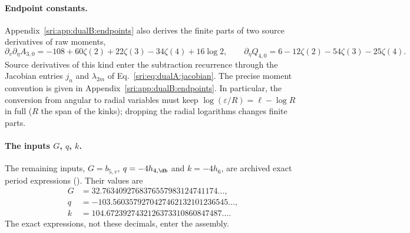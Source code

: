 \paragraph{Endpoint constants.} Appendix~\ref{sri:app:dualB:endpoints} also derives the finite parts of two source
derivatives of raw moments,
\begin{equation}
 \partial_v\partial_\eta A_{3,0}=-108+60\zeta(2)+22\zeta(3)-34\zeta(4)+16\log2,\qquad
 \partial_\eta Q_{4,0}=6-12\zeta(2)-54\zeta(3)-25\zeta(4).
 \label{sri:eq:dualB:endpointconstants}
\end{equation}
Source derivatives of this kind enter the subtraction recurrence through the Jacobian entries $j_n$ and
$\lambda_{2m}$ of Eq.~\eqref{sri:eq:dualA:jacobian}. The precise moment convention is given in
Appendix~\ref{sri:app:dualB:endpoints}. In particular, the conversion from angular to radial variables must keep
$\log(\varepsilon/R)=\ell-\log R$ in full ($R$ the span of the kinks); dropping the radial logarithms changes finite parts.

\paragraph{The inputs $G$, $q$, $k$.} The remaining inputs, $G=b_{5,v}$, $q=-4h_{4,\db}$ and $k=-4h_6$, are archived
exact period expressions (). Their values are
\begin{equation}
\begin{aligned}
 G&=32.7634092768376557983124741174\ldots,\\
 q&=-103.5603579270427462132101236545\ldots,\\
 k&=104.6723927432126373310860847487\ldots.
\end{aligned}
\end{equation}
The exact expressions, not these decimals, enter the assembly.

